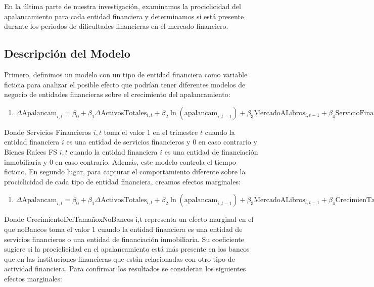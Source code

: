 \documentclass[a4paper,fleqn]{cas-sc}
\begin{document}
En la última parte de nuestra investigación, examinamos la prociclicidad del apalancamiento para cada entidad financiera y determinamos si está presente durante los periodos de dificultades financieras en el mercado financiero.

\subsection{Descripción del Modelo}

Primero, definimos un modelo con un tipo de entidad financiera como variable ficticia para analizar el posible efecto que podrían tener diferentes modelos de negocio de entidades financieras sobre el crecimiento del apalancamiento:

\begin{enumerate}[(5)]
    \item $\Delta \text{Apalancam}_{i,t} = \beta_0 + \beta_1 \Delta \text{ActivosTotales}_{i,t} + \beta_2 \ln(\text{apalancam}_{i,t-1}) + \beta_3 \text{MercadoALibros}_{i,t-1} + \beta_4 \text{ServicioFinanciero}_{i,t} + \beta_5 \text{ServicioFinancieroDeBienesRaíces}_{i,t} + \sum\limits_{2005}^{2023} \text{año}$
\end{enumerate}

Donde Servicios Financieros $i,t$ toma el valor 1 en el trimestre $t$ cuando la entidad financiera $i$ es una entidad de servicios financieros y $0$ en caso contrario y Bienes Raíces FS $i,t$ cuando la entidad financiera $i$ es una entidad de financiación inmobiliaria y 0 en caso contrario. Además, este modelo controla el tiempo ficticio.
En segundo lugar, para capturar el comportamiento diferente sobre la prociclicidad de cada tipo de entidad financiera, creamos efectos marginales:

\begin{enumerate}[(6)]
    \item $\Delta \text{Apalancam}_{i,t} = \beta_0 + \beta_1 \Delta \text{ActivosTotales}_{i,t} + \beta_2 \ln(\text{apalancam}_{i,t-1}) + \beta_3 \text{MercadoALibros}_{i,t-1} + \beta_4 \text{CrecimienTamaño} \times \text{NoBancos}_{i,t}$
\end{enumerate}

Donde CrecimientoDelTamañoxNoBancos i,t representa un efecto marginal en el que noBancos toma el valor 1 cuando la entidad financiera es una entidad de servicios financieros o una entidad de financiación inmobiliaria. Su coeficiente sugiere si la prociclicidad en el apalancamiento está más presente en los bancos que en las instituciones financieras que están relacionadas con otro tipo de actividad financiera. Para confirmar los resultados se consideran los siguientes efectos marginales:
\end{document}
